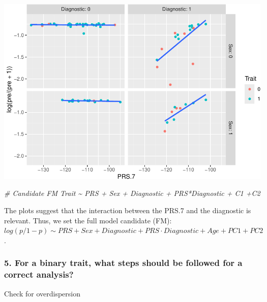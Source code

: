 \documentclass[
]{article}
\newenvironment{Shaded}{\begin{snugshade}}{\end{snugshade}}
\newcommand{\AttributeTok}[1]{\textcolor[rgb]{0.77,0.63,0.00}{#1}}
\newcommand{\CommentTok}[1]{\textcolor[rgb]{0.56,0.35,0.01}{\textit{#1}}}
\newcommand{\FloatTok}[1]{\textcolor[rgb]{0.00,0.00,0.81}{#1}}
\newcommand{\FunctionTok}[1]{\textcolor[rgb]{0.00,0.00,0.00}{#1}}
\newcommand{\NormalTok}[1]{#1}
\newcommand{\OtherTok}[1]{\textcolor[rgb]{0.56,0.35,0.01}{#1}}
\newcommand{\SpecialCharTok}[1]{\textcolor[rgb]{0.00,0.00,0.00}{#1}}
\begin{document}
\includegraphics{WorkingExample4_code_files/figure-latex/unnamed-chunk-6-1.pdf}

\begin{Shaded}
\begin{Highlighting}[]
\CommentTok{\# Candidate FM Trait \textasciitilde{} PRS + Sex + Diagnostic + PRS*Diagnostic + C1 +C2}
\end{Highlighting}
\end{Shaded}

The plots suggest that the interaction between the PRS.7 and the
diagnostic is relevant. Thus, we set the full model candidate (FM):
\(log(p/1-p) \sim PRS + Sex + Diagnostic + PRS \cdot Diagnostic + Age + PC1 +PC2\).

\hypertarget{for-a-binary-trait-what-steps-should-be-followed-for-a-correct-analysis}{%
\subsubsection{5. For a binary trait, what steps should be followed for
a correct
analysis?}\label{for-a-binary-trait-what-steps-should-be-followed-for-a-correct-analysis}}

Check for overdispersion

\begin{Shaded}
\end{Shaded}
\end{document}
